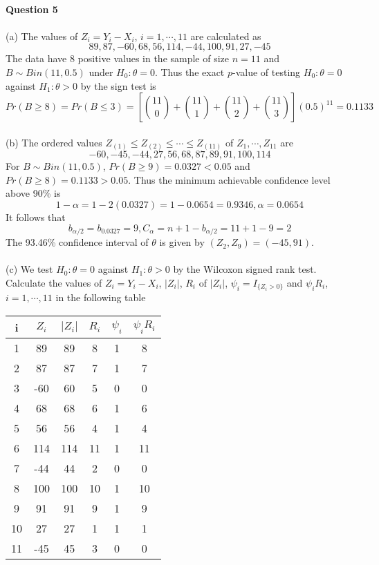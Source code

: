\documentclass[12pt,a4paper]{article}
\begin{document}
~\\
\indent \textbf{Question 5}\\
~\\
(a) The values of $Z_{i}=Y_{i}-X_{i}$, $i=1,\cdots,11$ are calculated as $$89,87,-60,68,56,114,-44,100,91,27,-45$$ The data have 8 positive values in the sample of size $n=11$ and $B \sim Bin(11,0.5)$ under $H_{0}:\theta =0$. Thus the exact $p$-value of testing $H_{0}:\theta =0$ against $H_{1}:\theta >0$ by the sign test is
$$Pr(B\geqslant 8)=Pr(B\leqslant 3)=\left[{11\choose 0}+{11\choose 1}+{11\choose 2}+{11\choose 3}\right](0.5)^{11}=0.1133$$
~\\
(b) The ordered values $Z_{(1)}\leqslant Z_{(2)}\leqslant \cdots \leqslant Z_{(11)}$ of $Z_{1},\cdots,Z_{11}$ are
$$-60,-45,-44,27,56,68,87,89,91,100,114$$
For $B \sim Bin(11,0.5)$, $Pr(B\geqslant 9)=0.0327<0.05$ and $Pr(B\geqslant 8)=0.1133>0.05$. Thus the minimum achievable confidence level above 90\% is
$$1-\alpha=1-2(0.0327)=1-0.0654=0.9346, \alpha=0.0654$$
It follows that
$$b_{\alpha/2}=b_{0.0327}=9, C_{\alpha}=n+1-b_{\alpha/2}=11+1-9=2$$
The 93.46\% confidence interval of $\theta$ is given by $(Z_{2},Z_{9})=(-45,91)$.\\
~\\
(c) We test $H_{0}:\theta =0$ against $H_{1}:\theta >0$ by the Wilcoxon signed rank test. Calculate the values of $Z_{i}=Y_{i}-X_{i}$, $|Z_{i}|$, $R_{i}$ of $|Z_{i}|$, $\psi_{i}=I_{\{Z_{i}>0\}}$ and $\psi_{i}R_{i}$, $i=1,\cdots,11$ in the following table
\begin{center}
	\begin{tabular}{ |c|c c c c c| }
		\hline
		i & $Z_{i}$ & $|Z_{i}|$ & $R_{i}$ & $\psi_{i}$ & $\psi_{i}R_{i}$\\ 
		\hline
		1 & 89 & 89 & 8 & 1 & 8\\ 
		2 & 87 & 87 & 7 & 1 & 7\\ 
		3 & -60 & 60 & 5 & 0 & 0\\
		4 & 68 & 68 & 6 & 1 & 6\\
		5 & 56 & 56 & 4 & 1 & 4\\
		6 & 114 & 114 & 11 & 1 & 11\\
		7 & -44 & 44 & 2 & 0 & 0\\
		8 & 100 & 100 & 10 & 1 & 10\\
		9 & 91 & 91 & 9 & 1 & 9\\
		10 & 27 & 27 & 1 & 1 & 1\\
		11 & -45 & 45 & 3 & 0 & 0\\
		\hline
	\end{tabular}
\end{center}
\end{document}
